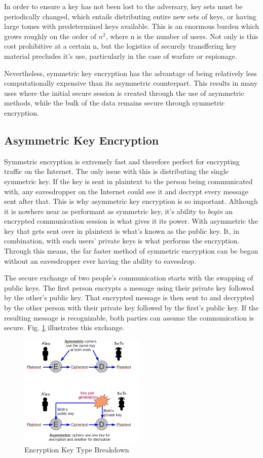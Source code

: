 \documentclass[journal]{IEEEtran}
\begin{document}
In order to ensure a key has not been lost to the adversary, key sets must be periodically changed, which entails distributing entire new sets of keys, or having large tomes with predetermined keys available.  This is an enormous burden which grows roughly on the order of $n^2$, where n is the number of users.  Not only is this cost prohibitive at a certain n, but the logistics of securely transffering key material precludes it's use, particularly in the case of warfare or espionage.

Nevertheless, symmetric key encryption has the advantage of being relatively less computationally expensive than its asymmetric counterpart.  This results in many uses where the initial secure session is created through the use of asymmetric methods, while the bulk of the data remains secure through symmetric encryption.

\subsection{Asymmetric Key Encryption}

Symmetric encryption is extremely fast and therefore perfect for encrypting traffic on the Internet.  The only issue with this is distributing the single symmetric key.  If the key is sent in plaintext to the person being communicated with, any eavesdropper on the Internet could see it and decrypt every message sent after that.  This is why asymmetric key encryption is so important.  Although it is nowhere near as performant as symmetric key, it's ability to \emph{begin} an encrypted communication session is what gives it its power.  With asymmetric the key that gets sent over in plaintext is what's known as the public key.  It, in combination, with each users' private keys is what performs the encryption.  Through this means, the far faster method of symmetric encryption can be began without an eavesdropper ever having the ability to eavesdrop.

The secure exchange of two people's communication starts with the swapping of public keys.  The first person encrypts a message using their private key followed by the other's public key.  That encrypted message is then sent to and decrypted by the other person with their private key followed by the first's public key.  If the resulting message is recognizable, both parties can assume the communication is secure.  Fig. \ref{keytypes} illustrates this exchange.

\begin{figure}[htbp]
	\centering
	\includegraphics[width=6cm,keepaspectratio]{img/encryptionkeytypes.png}
	\caption{Encryption Key Type Breakdown \cite{KeyFigure} }
	\label{keytypes}
\end{figure}
\end{document}
